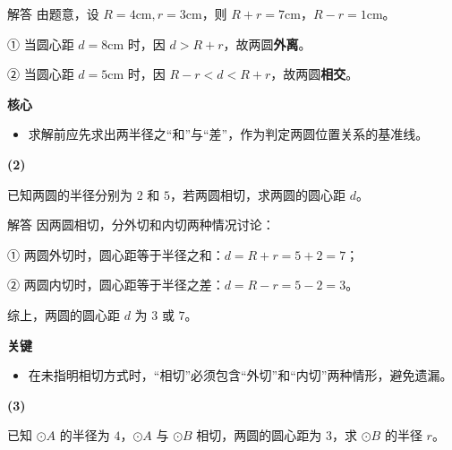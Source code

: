 \documentclass{exam-zh}
\newenvironment{eduSubQuestionItem}[1]{%
  \needspace{4\baselineskip}%
  \vspace{2mm}
  \par\noindent
  \hangindent=8mm\hangafter=1
  {\color{edu-blue}\bfseries #1}\enspace
  \begingroup
  \color{edu-ink}
}{%
  \endgroup
  \par
  \vspace{3mm}
}
\newenvironment{eduBulletList}{%
  \begin{itemize}[
    label=\textbullet,
    leftmargin=5mm,
    itemsep=1.2mm,
    topsep=0pt,
    parsep=0pt
  ]
}{%
  \end{itemize}
}
\begin{document}
\begin{eduSolutionBox}{解答}
  \begingroup
  \setlength{\parskip}{2.5mm}
由题意，设 $R = 4\text{cm}, r = 3\text{cm}$，则 $R+r = 7\text{cm}$，$R-r = 1\text{cm}$。\par
① 当圆心距 $d = 8\text{cm}$ 时，因 $d > R+r$，故两圆\textbf{外离}。\par
② 当圆心距 $d = 5\text{cm}$ 时，因 $R-r < d < R+r$，故两圆\textbf{相交}。\par
  \endgroup
  \vspace{2.5mm}
  {\color{edu-blue}\bfseries\small 核心}\par\vspace{1.5mm}
  \begin{eduBulletList}
    \item 求解前应先求出两半径之“和”与“差”，作为判定两圆位置关系的基准线。  \end{eduBulletList}
\end{eduSolutionBox}




\begin{eduSubQuestionItem}{(2)}
已知两圆的半径分别为 $2$ 和 $5$，若两圆相切，求两圆的圆心距 $d$。\end{eduSubQuestionItem}

\begin{eduSolutionBox}{解答}
  \begingroup
  \setlength{\parskip}{2.5mm}
因两圆相切，分外切和内切两种情况讨论：\par
① 两圆外切时，圆心距等于半径之和：$d = R+r = 5+2=7$；\par
② 两圆内切时，圆心距等于半径之差：$d = R-r = 5-2=3$。\par
综上，两圆的圆心距 $d$ 为 $3$ 或 $7$。\par
  \endgroup
  \vspace{2.5mm}
  {\color{edu-blue}\bfseries\small 关键}\par\vspace{1.5mm}
  \begin{eduBulletList}
    \item 在未指明相切方式时，“相切”必须包含“外切”和“内切”两种情形，避免遗漏。  \end{eduBulletList}
\end{eduSolutionBox}




\begin{eduSubQuestionItem}{(3)}
已知 $\odot A$ 的半径为 $4$，$\odot A$ 与 $\odot B$ 相切，两圆的圆心距为 $3$，求 $\odot B$ 的半径 $r$。\end{eduSubQuestionItem}
\end{document}
